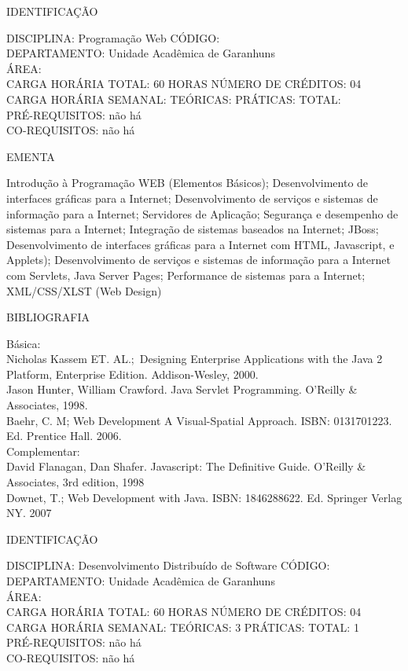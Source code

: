 \documentclass[
	12pt,				%
	openright,			%
  oneside,     %
	a4paper,			%
	english,			%
	french,				%
	spanish,			%
	brazil				%
	]{abntex2}
\begin{document}
\begin{apendicesenv}
\newpage IDENTIFICAÇÃO

DISCIPLINA: Programação Web CÓDIGO:\\ 
DEPARTAMENTO: Unidade Acadêmica de Garanhuns\\ 
ÁREA: \\
CARGA HORÁRIA TOTAL: 60 HORAS NÚMERO DE CRÉDITOS: 04\\
CARGA HORÁRIA SEMANAL: TEÓRICAS: PRÁTICAS: TOTAL: \\
PRÉ-REQUISITOS: não há\\
CO-REQUISITOS: não há

EMENTA 

Introdução à Programação WEB (Elementos Básicos); Desenvolvimento de interfaces gráficas para a Internet; Desenvolvimento de serviços e sistemas de informação para a Internet; Servidores de Aplicação; Segurança e desempenho de sistemas para a Internet; Integração de sistemas baseados na Internet; JBoss; Desenvolvimento de interfaces gráficas para a Internet com HTML, Javascript, e Applets); Desenvolvimento de serviços e sistemas de informação para a Internet com Servlets, Java Server Pages; Performance de sistemas para a Internet; XML/CSS/XLST (Web Design)

BIBLIOGRAFIA 

Básica:\\
Nicholas Kassem ET. AL.;~Designing Enterprise Applications with the Java
2 Platform, Enterprise Edition. Addison-Wesley, 2000.\\
Jason Hunter, William Crawford. Java Servlet Programming.
O'Reilly \& Associates, 1998.\\
Baehr, C. M; Web Development A Visual-Spatial Approach. ISBN:
0131701223. Ed. Prentice Hall. 2006.\\
Complementar:\\
David Flanagan, Dan Shafer. Javascript: The Definitive Guide.
O'Reilly \& Associates, 3rd edition, 1998\\
Downet, T.; Web Development with Java. ISBN: 1846288622. Ed. Springer
Verlag NY. 2007

\newpage IDENTIFICAÇÃO

DISCIPLINA: Desenvolvimento Distribuído de Software CÓDIGO:\\ 
DEPARTAMENTO: Unidade Acadêmica de Garanhuns\\ 
ÁREA: \\
CARGA HORÁRIA TOTAL: 60 HORAS NÚMERO DE CRÉDITOS: 04\\
CARGA HORÁRIA SEMANAL: TEÓRICAS: 3 PRÁTICAS: TOTAL: 1\\
PRÉ-REQUISITOS: não há\\
CO-REQUISITOS: não há


\end{apendicesenv}
\end{document}
